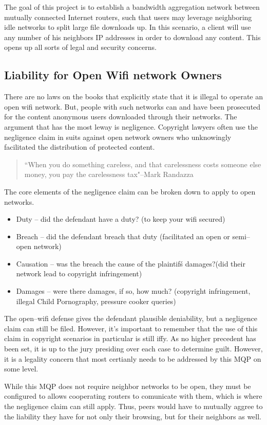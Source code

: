 \documentclass{article}
\begin{document}
The goal of this project is to establish a bandwidth aggregation network between mutually connected Internet routers, such that users may leverage neighboring idle networks to split large file downloads up. In this scenario, a client will use any number of his neighbors IP addresses in order to download any content. This opens up all sorts of legal and security concerns. 

\subsection{Liability for Open Wifi network Owners}

There are no laws on the books that explicitly state that it is illegal to operate an open wifi network. But, people with such networks can and have been prosecuted for the content anonymous users downloaded through their networks. The argument that has the most leway is negligence. Copyright lawyers often use the negligence claim in suits against open network owners who unknowingly facilitated the distribution of protected content.

\begin{quotation}``When you do something careless, and that carelessness costs someone else money, you pay the carelessness tax"--Mark Randazza\end{quotation}

The core elements of the negligence claim can be broken down to apply to open networks.
\begin{itemize}
\item Duty -- did the defendant have a duty? (to keep your wifi secured)
\item Breach -- did the defendant breach that duty (facilitated an open or semi--open network)
\item Causation -- was the breach the cause of the plaintif\'s damages?(did their network lead to copyright infringement)
\item Damages -- were there damages, if so, how much? (copyright infringement, illegal Child Pornography, pressure cooker queries)
\end{itemize}

The open--wifi defense gives the defendant plausible deniability, but a negligence claim can still be filed. However, it's important to remember that the use of this claim in copyright scenarios in particular is still iffy. As no higher precedent has been set, it is up to the jury presiding over each case to determine guilt. However, it is a legality concern that most certianly needs to be addressed by this MQP on some level.

While this MQP does not require neighbor networks to be open, they must be configured to allows cooperating routers to comunicate with them, which is where the negligence claim can still apply. Thus, peers would have to mutually aggree to the liability they have for not only their browsing, but for their neighbors as well. 
\end{document}
